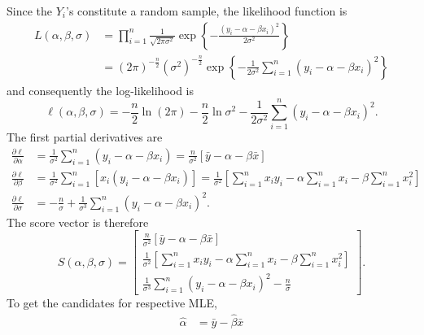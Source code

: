 \documentclass[notoc,notitlepage]{tufte-book}
\begin{document}
\begin{solution}
  Since the $Y_i$'s constitute a random sample, the likelihood function is
  \begin{align*}
    L(\alpha, \beta, \sigma) &= \prod_{i=1}^{n} \frac{1}{\sqrt{2 \pi \sigma^2}} \exp\left\{ - \frac{(y_i - \alpha - \beta x_i)^2}{2 \sigma^2} \right\} \\
                             &= (2\pi)^{- \frac{n}{2}} \left( \sigma^2 \right)^{-\frac{n}{2}} \exp \left\{ - \frac{1}{2 \sigma^2} \sum_{i=1}^{n} \left(y_i - \alpha - \beta x_i\right)^2 \right\}
  \end{align*}
  and consequently the log-likelihood is
  \begin{equation*}
    \ell(\alpha, \beta, \sigma) = - \frac{n}{2} \ln ( 2 \pi ) - \frac{n}{2} \ln \sigma^2 - \frac{1}{2 \sigma^2} \sum_{i=1}^{n} \left( y_i - \alpha - \beta x_i \right)^2.
  \end{equation*}
  The first partial derivatives are
  \begin{align*}
    \frac{\partial \ell}{\partial \alpha} &= \frac{1}{\sigma^2} \sum_{i=1}^{n} (y_i - \alpha - \beta x_i) = \frac{n}{\sigma^2} \left[ \bar{y} - \alpha - \beta \bar{x} \right] \\
    \frac{\partial \ell}{\partial \beta} &= \frac{1}{\sigma^2} \sum_{i=1}^{n} \left[ x_i (y_i - \alpha - \beta x_i) \right] = \frac{1}{\sigma^2} \left[ \sum_{i=1}^{n} x_i y_i  - \alpha \sum_{i=1}^{n} x_i - \beta \sum_{i=1}^{n} x_i^2 \right] \\
    \frac{\partial \ell}{\partial \sigma} &= - \frac{n}{\sigma} + \frac{1}{\sigma^3} \sum_{i=1}^{n} \left(y_i - \alpha - \beta x_i\right)^2.
  \end{align*}
  The score vector is therefore
  \begin{equation*}
    S(\alpha, \beta, \sigma) = \begin{bmatrix}
      \frac{n}{\sigma^2} \left[ \bar{y} - \alpha - \beta \bar{x} \right] \\
      \frac{1}{\sigma^2} \left[ \sum_{i=1}^{n} x_i y_i  - \alpha \sum_{i=1}^{n} x_i - \beta \sum_{i=1}^{n} x_i^2 \right] \\
      \frac{1}{\sigma^3} \sum_{i=1}^{n} (y_i - \alpha - \beta x_i)^2 - \frac{n}{\sigma}
    \end{bmatrix}.
  \end{equation*}
  To get the candidates for respective MLE,
  \begin{align*}
    \hat{\alpha} &= \bar{y} - \hat{\beta} \bar{x} \\

\end{align*}
\end{solution}
\end{document}
